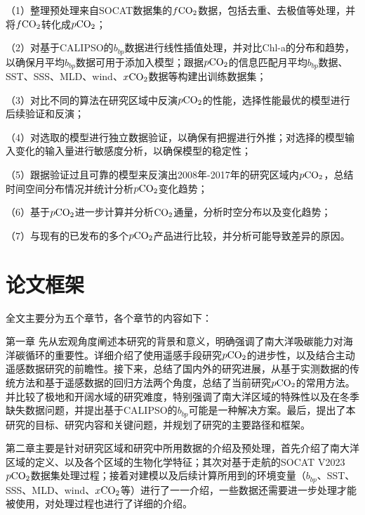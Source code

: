 （1）整理预处理来自SOCAT数据集的$f\rm CO_2$数据，包括去重、去极值等处理，并将$f\rm CO_2$转化成$p\rm CO_2$；

（2）对基于CALIPSO的$b_{bp}$数据进行线性插值处理，并对比Chl-a的分布和趋势，以确保月平均$b_{bp}$数据可用于添加入模型；跟据$p\rm CO_2$的信息匹配月平均$b_{bp}$数据、SST、SSS、MLD、wind、$x\rm CO_2$数据等构建出训练数据集；

（3）对比不同的算法在研究区域中反演$p\rm CO_2$的性能，选择性能最优的模型进行后续验证和反演；

（4）对选取的模型进行独立数据验证，以确保有把握进行外推；对选择的模型输入变化的输入量进行敏感度分析，以确保模型的稳定性；

（5）跟据验证过且可靠的模型来反演出2008年-2017年的研究区域内$p\rm CO_2$，总结时间空间分布情况并统计分析$p\rm CO_2$变化趋势；

（6）基于$p\rm CO_2$进一步计算并分析$\rm CO_2$通量，分析时空分布以及变化趋势；

（7）与现有的已发布的多个$p\rm CO_2$产品进行比较，并分析可能导致差异的原因。
\section{论文框架}
全文主要分为五个章节，各个章节的内容如下：

第一章 先从宏观角度阐述本研究的背景和意义，明确强调了南大洋吸碳能力对海洋碳循环的重要性。详细介绍了使用遥感手段研究$p\rm CO_2$的进步性，以及结合主动遥感数据研究的前瞻性。接下来，总结了国内外的研究进展，从基于实测数据的传统方法和基于遥感数据的回归方法两个角度，总结了当前研究$p\rm CO_2$的常用方法。并比较了极地和开阔水域的研究难度，特别强调了南大洋区域的特殊性以及在冬季缺失数据问题，并提出基于CALIPSO的$b_{bp}$可能是一种解决方案。最后，提出了本研究的目标、研究内容和关键问题，并规划了研究的主要路径和框架。

第二章主要是针对研究区域和研究中所用数据的介绍及预处理，首先介绍了南大洋区域的定义、以及各个区域的生物化学特征；其次对基于走航的SOCAT V2023 $p\rm CO_2$数据集处理过程；接着对建模以及后续计算所用到的环境变量（$b_{bp}$、SST、SSS、MLD、wind、$x\rm CO_2$等）进行了一一介绍，一些数据还需要进一步处理才能被使用，对处理过程也进行了详细的介绍。

